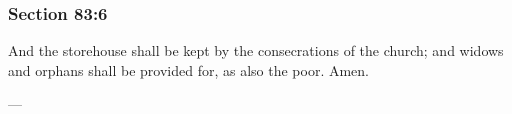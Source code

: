 	\subsubsection{Section 83:6} %
		\label{DC83-6}

		And the storehouse shall be kept by the consecrations of the church; and widows and orphans shall be provided for, as also the poor.  Amen.

		\begin{framed}
		\scriptsize
			\begin{compactdesc}
				\item[JSP] ---
			\end{compactdesc}
		\end{framed}